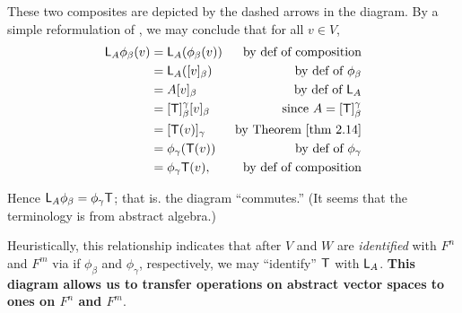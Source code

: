 \begin{remark} \label{remark 2.4.6}
These two composites are depicted by the dashed arrows in the diagram.
By a simple reformulation of , we may conclude that for all \(v \in V\),
\begin{align*}
    \LMTRAN_A \phi_{\beta}(v)
    & = \LMTRAN_A (\phi_{\beta}(v)) & \text{by def of composition} \\
    & = \LMTRAN_A([v]_{\beta}) & \text{by def of \(\phi_{\beta}\)} \\
    & = A [v]_{\beta} & \text{by def of \(\LMTRAN_A\)} \\
    & = [\T]_{\beta}^{\gamma} [v]_{\beta} & \text{since \(A = [\T]_{\beta}^{\gamma}\)} \\
    & = [\T(v)]_{\gamma} & \text{by \THM{2.14}} \\
    & = \phi_{\gamma}(\T(v)) & \text{by def of \(\phi_{\gamma}\)} \\
    & = \phi_{\gamma} \T (v), & \text{by def of composition}
\end{align*}

Hence \(\textsf{L}_A \phi_{\beta} = \phi_{\gamma} \textsf{T}\);
that is. the diagram ``commutes.'' (It seems that the terminology is from abstract algebra.)

Heuristically, this relationship indicates that after \(V\) and \(W\) are \emph{identified} with \(F^n\) and \(F^m\) via if \(\phi_{\beta}\) and \(\phi_{\gamma}\), respectively,
we may ``identify'' \(\textsf{T}\) with \(\textsf{L}_A\).
\textbf{This diagram allows us to transfer operations on abstract vector spaces to ones on \(F^n\) and \(F^m\)}.
\end{remark}

